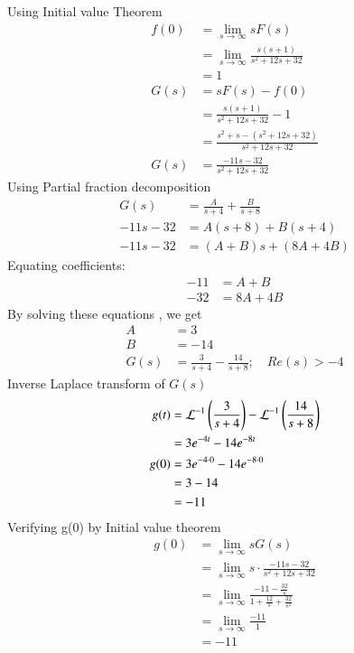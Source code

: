 \documentclass[journal,12pt,twocolumn]{IEEEtran}
\theoremstyle{remark}
\begin{document}
Using Initial value Theorem 
\begin{align}
    f(0) &= \lim_{s \to \infty} sF(s) \\
         &= \lim_{s \to \infty} \frac{s(s+1)}{s^2 + 12s + 32} \\
         &= 1 \\
    G(s) &= sF(s) - f(0) \\
         &= \frac{s(s+1)}{s^2 + 12s + 32} - 1 \\
         &= \frac{s^2 + s - (s^2 + 12s + 32)}{s^2 + 12s + 32} \\
         G(s) &= \frac{-11s - 32}{s^2 + 12s + 32} 
\end{align}
Using Partial fraction decomposition 
\begin{align}
      G(s)   &= \frac{A}{s+4} + \frac{B}{s+8}  \\
    -11s - 32 &= A(s+8) + B(s+4) \\
    -11s - 32 &= (A + B)s + (8A + 4B)
\end{align}
Equating coefficients:
\begin{align}
     -11 &= A + B \\
    -32 &= 8A + 4B
\end{align}
By solving these equations , we get 
\begin{align}
    A &= 3 \\
    B &= -14 \\
    G(s) &=\frac{3}{s+4} - \frac{14}{s+8} ; \quad Re(s) > -4
\end{align}
Inverse Laplace transform of $G(s)$ 
\begin{align}
g(t) &=\mathcal{L}^{-1}\left(\frac{3}{s+4}\right) -\mathcal{L}^{-1}\left(\frac{14}{s+8}\right) \\
   &= 3e^{-4t} - 14e^{-8t} \\
g(0) &= 3e^{-4 \cdot 0} - 14e^{-8 \cdot 0} \\
         &= 3 - 14 \\
         &= -11
\end{align}
Verifying g(0) by Initial value theorem
\begin{align}
    g(0) &= \lim_{s \to \infty} sG(s) \\
         &= \lim_{s \to \infty} s \cdot \frac{-11s - 32}{s^2 + 12s + 32} \\
         &= \lim_{s \to \infty} \frac{-11 - \frac{32}{s}}{1 + \frac{12}{s} + \frac{32}{s^2}} \\
         &= \lim_{s \to \infty} \frac{-11}{1} \\
         &= -11
\end{align}
\end{document}
